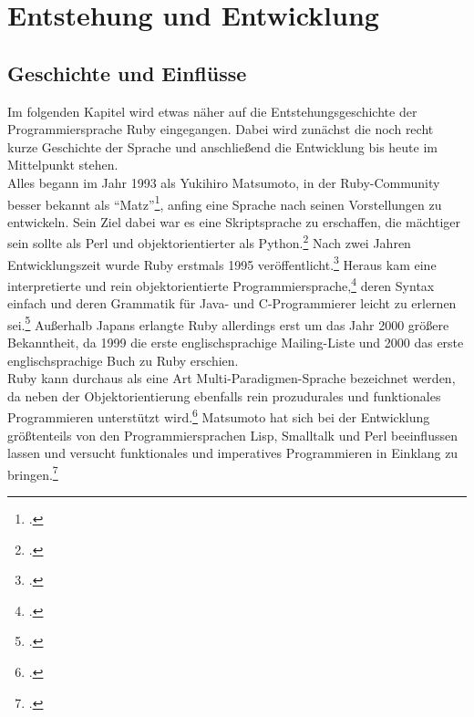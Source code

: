 \documentclass[a4paper, 11pt]{scrreprt}
\begin{document}
\chapter{Entstehung und Entwicklung}
\section{Geschichte und Einflüsse}
Im folgenden Kapitel wird etwas näher auf die Entstehungsgeschichte der Programmiersprache Ruby eingegangen. Dabei wird zunächst die noch recht kurze Geschichte der Sprache und anschließend die Entwicklung bis heute im Mittelpunkt stehen.\\
Alles begann im Jahr 1993 als Yukihiro Matsumoto, in der Ruby-Community besser bekannt als ``Matz''\footcite[vgl.][S.2]{ruby_lang}, anfing eine Sprache nach seinen Vorstellungen zu entwickeln. Sein Ziel dabei war es eine Skriptsprache zu erschaffen, die mächtiger sein sollte als Perl und objektorientierter als Python.\footcite[vgl.][S.486]{ruby}
Nach zwei Jahren Entwicklungszeit wurde Ruby erstmals 1995 veröffentlicht.\footcite[vgl.][]{ruby_org} Heraus kam eine interpretierte und rein objektorientierte Programmiersprache,\footcite[vgl.][S.486]{ruby} deren Syntax einfach und deren Grammatik für Java- und C-Programmierer leicht zu erlernen sei.\footcite[vlg.][S.2]{ruby_lang} Außerhalb Japans erlangte Ruby allerdings erst um das Jahr 2000 größere Bekanntheit, da 1999 die erste englischsprachige Mailing-Liste und 2000 das erste englischsprachige Buch zu Ruby erschien.\\
Ruby kann durchaus als eine Art Multi-Paradigmen-Sprache bezeichnet werden, da neben der Objektorientierung ebenfalls rein prozudurales und funktionales Programmieren unterstützt wird.\footcite[vgl.][S.2]{ruby_lang} Matsumoto hat sich bei der Entwicklung größtenteils von den Programmiersprachen Lisp, Smalltalk und Perl beeinflussen lassen und versucht funktionales und imperatives Programmieren in Einklang zu bringen.\footcite[vgl.][]{ruby_org}
\end{document}
